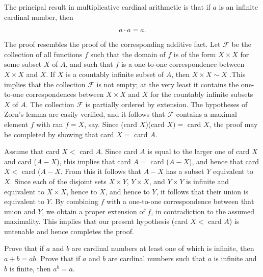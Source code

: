 The principal result in multiplicative cardinal arithmetic is that if $a$ is an infinite cardinal number, then 

\begin{equation*}
a \cdot a = a. 
\end{equation*}

The proof resembles the proof of the corresponding additive fact. Let $\mathcal{F}$ be the collection of all functions $f$ such that the domain of $f$ is of the form $X \times X$ for some subset $X$ of $A$, and such that $f$ is a one-to-one correspondence between $X \times X$ and $X$. If $X$ is a countably infinite subset of $A$, then $X \times X \sim X$ .This implies that the collection $\mathcal{F}$ is not empty; at the very least it contains the one-to-one correspondences between $X \times X$ and $X$ for the countably infinite subsets $X$ of $A$. The collection $\mathcal{F}$ is partially ordered by extension. The hypotheses of Zorn's lemma are easily verified, and it follows that $\mathcal{F}$ contains a maximal element $f$ with ran $f = X$, say. Since (card $X$)(card $X) =$ card $X$, the proof may be completed by showing that card $X =$ card $A$. 

Assume that card $X <$ card $A$. Since card $A$ is equal to the larger one of card $X$ and card ($A - X$), this implies that card $A =$ card ($A - X$), and hence that card $X <$ card ($A - X$. From this it follows that $A - X$ has a subset $Y$ equivalent to $X$. Since each of the disjoint sets $X \times Y$, $Y \times X$, and $Y \times Y$ is infinite and equivalent to $X \times X$, hence to $X$, and hence to $Y$, it follows that their union is equivalent to $Y$. By combining $f$ with a one-to-one correspondence between that union and $Y$, we obtain a proper extension of $f$, in contradiction to the assumed maximality. This implies that our present hypothesis (card $X <$ card $A$) is untenable and hence completes the proof. 

\begin{named}[EXERCISE. ] Prove that if $a$ and $b$ are cardinal numbers at least one of which is infinite, then $a + b = ab$. Prove that if $a$ and $b$ are cardinal numbers such that $a$ is infinite and $b$ is finite, then $a^{b} = a$.
\end{named}
